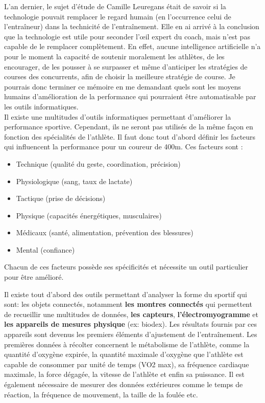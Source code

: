 L'an dernier, le sujet d'étude de Camille Leuregans était de savoir si la technologie pouvait remplacer le regard humain (en l’occurrence celui de l’entraîneur) dans la technicité de l’entraînement. Elle en ai arrivé à la conclusion que la technologie est utile pour seconder l’œil expert du coach, mais n'est pas capable de le remplacer complètement. En effet, aucune intelligence artificielle n'a pour le moment la capacité de soutenir moralement les athlètes, de les encourager, de les pousser à se surpasser et même d’anticiper les stratégies de courses des concurrents, afin de choisir la meilleure stratégie de course. 
Je pourrais donc  terminer ce mémoire en me demandant quels sont les moyens humains d'amélioration de la performance qui pourraient être automatisable par les outils informatiques.\\

Il existe une multitudes d'outils informatiques permettant d'améliorer la performance sportive. Cependant, ils ne seront pas utilisés de la même façon en fonction des spécialités de l'athlète. Il faut donc tout d'abord définir les facteurs qui influencent la performance pour un coureur de 400m.
Ces facteurs sont :
\begin{itemize}
\item Technique (qualité du geste, coordination, précision)
\item Physiologique (sang, taux de lactate)
\item Tactique (prise de décisions)
\item Physique (capacités énergétiques, musculaires)
\item Médicaux (santé, alimentation, prévention des blessures)
\item Mental (confiance)\\

\end{itemize}

Chacun de ces facteurs possède ses spécificités et nécessite un outil particulier pour être amélioré.

Il existe tout d'abord des outils permettant d'analyser la forme du sportif qui sont: les objets connectés, notamment \textbf{les montres connectés} qui permettent de recueillir une multitudes de données, \textbf{les capteurs},  \textbf{l'électromyogramme} et \textbf{les appareils de mesures physique} (ex: biodex). Les résultats fournis par ces appareils sont devenus les premiers éléments d'ajustement de l'entraînement. Les premières données à récolter concernent le métabolisme de l'athlète, comme la quantité d'oxygène expirée, la quantité maximale d’oxygène que l’athlète est capable de consommer par unité de temps (VO2 max), sa fréquence cardiaque maximale, la force dégagée, la vitesse de l'athlète et enfin sa puissance. Il est également nécessaire de mesurer des données extérieures comme le temps de réaction, la fréquence de mouvement, la taille de la foulée etc.

